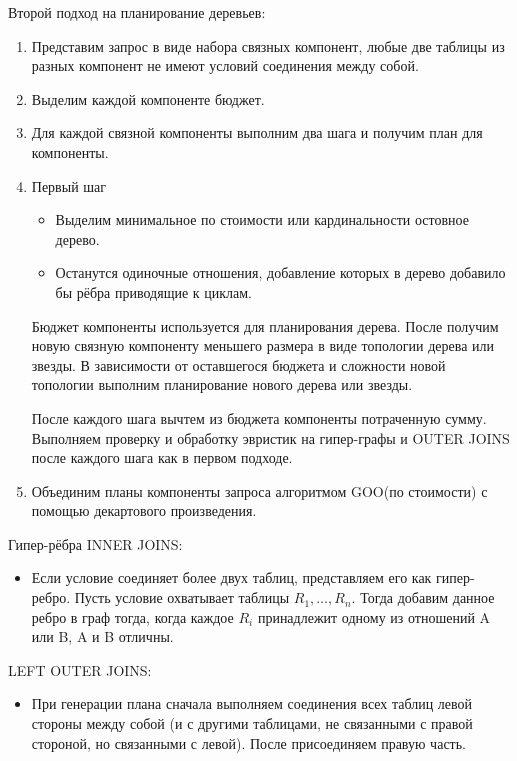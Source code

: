 \documentclass[12pt]{article}
\begin{document}
\begin{flushleft}
\begin{center}
Второй подход на планирование деревьев:
\end{center}

\begin{enumerate}
    \item Представим запрос в виде набора связных компонент, любые две таблицы из разных компонент не имеют условий соединения между собой. 
    \item Выделим каждой компоненте бюджет.
    \item Для каждой связной компоненты выполним два шага и получим план для компоненты.
    \item Первый шаг
    \begin{itemize}[label={}]
        \item Выделим минимальное по стоимости или кардинальности остовное дерево.
        \item Останутся одиночные отношения, добавление которых в дерево добавило бы рёбра приводящие к циклам.
    \end{itemize}
    Бюджет компоненты используется для планирования дерева. После получим новую связную компоненту меньшего размера в виде топологии дерева или звезды.
    В зависимости от оставшегося бюджета и сложности новой топологии выполним планирование нового дерева или звезды.
    \newline
    
    После каждого шага вычтем из бюджета компоненты потраченную сумму.
    Выполняем проверку и обработку эвристик на гипер-графы и OUTER JOINS после каждого шага как в первом подходе.
    \item Объединим планы компоненты запроса алгоритмом GOO(по стоимости) с помощью декартового произведения.
\end{enumerate}

Гипер-рёбра INNER JOINS:
\begin{itemize}[label={}]
    \item Если условие соединяет более двух таблиц, представляем его как гипер-ребро. Пусть условие охватывает таблицы $R_1,\dots,R_n$. Тогда добавим данное ребро в граф тогда, когда каждое $R_i$ принадлежит одному из отношений A или B, 
    A и B отличны.
\end{itemize}

LEFT OUTER JOINS: 
\begin{itemize}[label={}]
    \item При генерации плана сначала выполняем соединения всех таблиц левой стороны между собой (и с другими таблицами, не связанными с правой стороной, но связанными с левой). После присоединяем правую часть.
\end{itemize}


\end{flushleft}
\end{document}
